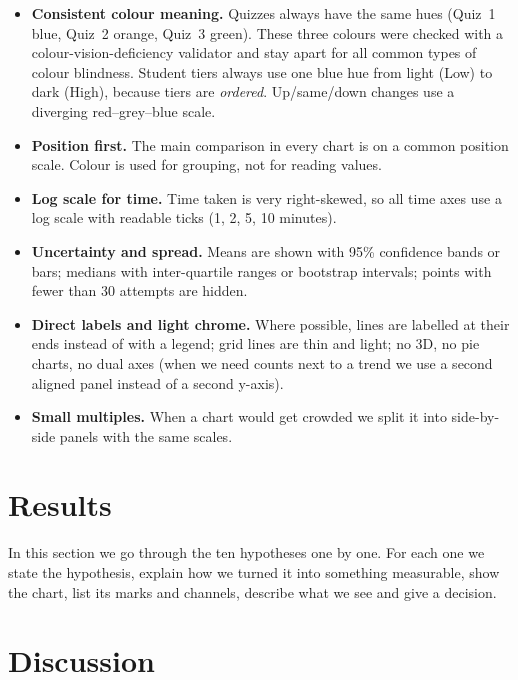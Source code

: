 \documentclass[11pt,a4paper]{article}
\begin{document}
\begin{itemize}
  \item \textbf{Consistent colour meaning.} Quizzes always have the same hues
        (Quiz~1 blue, Quiz~2 orange, Quiz~3 green). These three colours were
        checked with a colour-vision-deficiency validator and stay apart for all
        common types of colour blindness. Student tiers always use one blue hue
        from light (Low) to dark (High), because tiers are \emph{ordered}.
        Up/same/down changes use a diverging red--grey--blue scale.
  \item \textbf{Position first.} The main comparison in every chart is on a
        common position scale. Colour is used for grouping, not for reading
        values.
  \item \textbf{Log scale for time.} Time taken is very right-skewed, so all
        time axes use a log scale with readable ticks (1, 2, 5, 10 minutes).
  \item \textbf{Uncertainty and spread.} Means are shown with 95\% confidence
        bands or bars; medians with inter-quartile ranges or bootstrap
        intervals; points with fewer than 30 attempts are hidden.
  \item \textbf{Direct labels and light chrome.} Where possible, lines are
        labelled at their ends instead of with a legend; grid lines are thin
        and light; no 3D, no pie charts, no dual axes (when we need counts next
        to a trend we use a second aligned panel instead of a second y-axis).
  \item \textbf{Small multiples.} When a chart would get crowded we split it
        into side-by-side panels with the same scales.
\end{itemize}

\section{Results}
\label{sec:results}

In this section we go through the ten hypotheses one by one. For each one we
state the hypothesis, explain how we turned it into something measurable, show
the chart, list its marks and channels, describe what we see and give a
decision.




\section{Discussion}
\label{sec:discussion}


\end{document}
